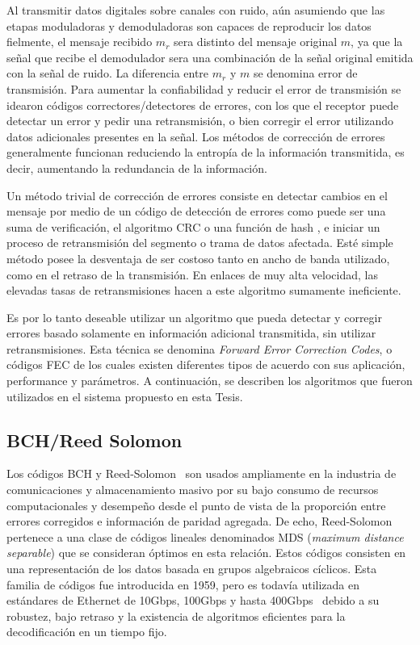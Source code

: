 Al transmitir datos digitales sobre canales con ruido, aún asumiendo que las etapas moduladoras y demoduladoras son capaces de reproducir los datos fielmente, el mensaje recibido $m_r$ sera distinto del mensaje original $m$, ya que la señal que recibe el demodulador sera una combinación de la señal original emitida con la señal de ruido. La diferencia entre $m_r$ y $m$ se denomina error de transmisión. Para aumentar la confiabilidad y reducir el error de transmisión se idearon códigos correctores/detectores de errores, con los que el receptor puede detectar un error y pedir una retransmisión, o bien corregir el error utilizando datos adicionales presentes en la señal. Los métodos de corrección de errores generalmente funcionan reduciendo la entropía de la información transmitida, es decir, aumentando la redundancia de la información.

Un método trivial de corrección de errores consiste en detectar cambios en el mensaje por medio de un código de detección de errores como puede ser una suma de verificación, el algoritmo CRC o una función de hash \cite{Menezes:1996:HAC:548089}, e iniciar un proceso de retransmisión del segmento o trama de datos afectada. Esté simple método posee la desventaja de ser costoso tanto en ancho de banda utilizado, como en el retraso de la transmisión. En enlaces de muy alta velocidad, las elevadas tasas de retransmisiones hacen a este algoritmo sumamente ineficiente.

Es por lo tanto deseable utilizar un algoritmo que pueda detectar y corregir errores basado solamente en información adicional transmitida, sin utilizar retransmisiones. Esta técnica se denomina \textsl{Forward Error Correction Codes}, o códigos FEC \cite{Moon:05} de los cuales existen diferentes tipos de acuerdo con sus aplicación, performance y parámetros. A continuación, se describen los algoritmos que fueron utilizados en el sistema propuesto en esta Tesis.

\subsection{BCH/Reed Solomon}
Los códigos BCH y Reed-Solomon~\cite{reed1960polynomial} son usados ampliamente en la industria de comunicaciones y almacenamiento masivo por su bajo consumo de recursos computacionales y desempeño desde el punto de vista de la proporción entre errores corregidos e información de paridad agregada. De echo, Reed-Solomon pertenece a una clase de códigos lineales denominados MDS (\textit{maximum distance separable}) que se consideran óptimos en esta relación. Estos códigos consisten en una representación de los datos basada en grupos algebraicos cíclicos.
Esta familia de códigos fue introducida en 1959, pero es todavía utilizada en estándares de Ethernet de 10Gbps, 100Gbps y hasta 400Gbps~\cite{liforward} debido a su robustez, bajo retraso y la existencia de algoritmos eficientes para la decodificación en un tiempo fijo.


